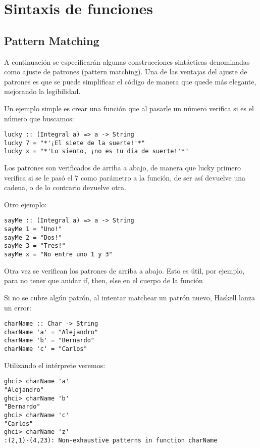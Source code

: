\section{Sintaxis de funciones} %
\label{sec:sintaxis_de_funciones}


\subsection{Pattern Matching} %
\label{sub:pattern_matching}


A continuación se especificarán algunas construcciones sintácticas denominadas como ajuste de patrones (pattern matching).
Una de las ventajas del ajuste de patrones es que se puede simplificar el código de manera que quede más elegante, mejorando la legibilidad.

Un ejemplo simple es crear una función que al pasarle un número verifica si es el número que buscamos:

\begin{lstlisting}
lucky :: (Integral a) => a -> String
lucky 7 = "*'¡El siete de la suerte!'*"
lucky x = "*'Lo siento, ¡no es tu día de suerte!'*"
\end{lstlisting}

Los patrones son verificados de arriba a abajo, de manera que lucky primero verifica si se le pasó el 7 como parámetro a la función, de ser así devuelve una cadena, o de lo contrario devuelve otra.

Otro ejemplo:

\begin{lstlisting}
sayMe :: (Integral a) => a -> String
sayMe 1 = "Uno!"
sayMe 2 = "Dos!"
sayMe 3 = "Tres!"
sayMe x = "No entre uno 1 y 3"
\end{lstlisting}

Otra vez se verifican los patrones de arriba a abajo. Esto es útil, por ejemplo, para no tener que anidar if, then, else en el cuerpo de la función

Si no se cubre algún patrón, al intentar matchear un patrón nuevo, Haskell lanza un error:

\begin{lstlisting}
charName :: Char -> String
charName 'a' = "Alejandro"
charName 'b' = "Bernardo"
charName 'c' = "Carlos"
\end{lstlisting}

Utilizando el intérprete veremos:

\begin{lstlisting}
ghci> charName 'a'
"Alejandro"
ghci> charName 'b'
"Bernardo"
ghci> charName 'c'
"Carlos"
ghci> charName 'z'
:(2,1)-(4,23): Non-exhaustive patterns in function charName
\end{lstlisting}

